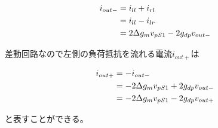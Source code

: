 \documentclass[twocolumn]{jsarticle}
\begin{document}
\begin{align}
    i_{out-}&=i_{ll}+i_{rl} \notag\\
    &=i_{ll}-i_{lr} \notag\\
    &=2\Delta g_{m}v_{pS1}-2g_{dp}v_{out-}
\end{align}

差動回路なので左側の負荷抵抗を流れる電流$i_{out+}$は

\begin{align}
    i_{out+}&=-i_{out-} \notag\\
    &=-2\Delta g_{m}v_{pS1}+2g_{dp}v_{out-} \notag\\
    &=-2\Delta g_{m}v_{pS1}-2g_{dp}v_{out+}
\end{align}

と表すことができる。
\end{document}
